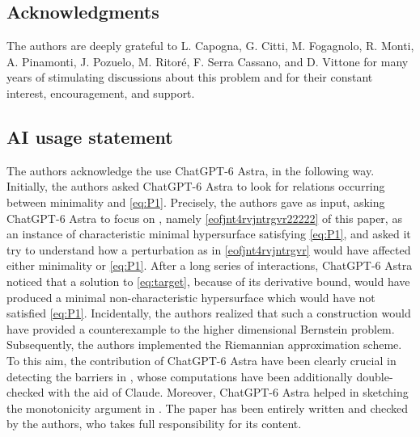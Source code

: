 \documentclass[11pt]{amsart}
\newcommand{\rr}{{\mathbb{R}}}
\theoremstyle{definition}
\newtheorem{remark}[theorem]{Remark}
\theoremstyle{remark}
\numberwithin{equation}{section}
\begin{document}
   \subsection*{Acknowledgments}
The authors are deeply grateful to L. Capogna, G. Citti, M. Fogagnolo, R. Monti, A. Pinamonti,
J. Pozuelo, M. Ritoré, F. Serra Cassano, and D. Vittone for many years
of stimulating discussions about this problem and for their constant
interest, encouragement, and support.

\subsection*{AI usage statement} 
The authors acknowledge the use ChatGPT-6 Astra, in the following way. 
Initially, the authors asked ChatGPT-6 Astra to look for relations occurring between minimality and \eqref{eq:P1}. Precisely, the authors gave \cite{simons} as input, asking ChatGPT-6 Astra to focus on \cite[Example 3.8]{simons}, namely \eqref{eofjnt4rvjntrgvr22222} of this paper, as an instance of characteristic minimal hypersurface satisfying \eqref{eq:P1}, and asked it try to understand how a perturbation as in \eqref{eofjnt4rvjntrgvr} would have affected either minimality or \eqref{eq:P1}. After a long series of interactions, ChatGPT-6 Astra noticed that a solution to \eqref{eq:target}, because of its derivative bound, would have produced a minimal non-characteristic hypersurface which would have not satisfied \eqref{eq:P1}. Incidentally, the authors realized that such a construction would have provided a counterexample to the higher dimensional Bernstein problem. Subsequently, the authors implemented the Riemannian approximation scheme. To this aim, the contribution of ChatGPT-6 Astra have been clearly crucial in detecting the barriers in , whose computations have been additionally double-checked with the aid of Claude. Moreover, ChatGPT-6 Astra helped in sketching the monotonicity argument in . 
The paper has been entirely written and checked by the authors, who takes full
responsibility for its content.
\end{document}
